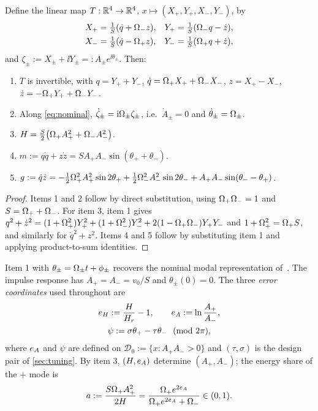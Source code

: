 \begin{lemma}\label{lem:modal}
Define the linear map $T:\mathbb{R}^4\to\mathbb{R}^4$, $x\mapsto(X_+,Y_+,X_-,Y_-)$, by
\begin{equation}\label{eq:T}
\begin{aligned}
  X_+&=\tfrac{1}{S}(\dot q+\Omega_- z), & Y_+&=\tfrac{1}{S}(\Omega_- q-\dot z),\\
  X_-&=\tfrac{1}{S}(\dot q-\Omega_+ z), & Y_-&=\tfrac{1}{S}(\Omega_+ q+\dot z),
\end{aligned}
\end{equation}
and $\zeta_\pm:=X_\pm+\ii Y_\pm=:A_\pm e^{\ii\theta_\pm}$.
Then:
\begin{enumerate}
\item $T$ is invertible, with $q=Y_++Y_-$, $\dot q=\Omega_+ X_++\Omega_- X_-$,
  $z=X_+-X_-$, $\dot z=-\Omega_+ Y_++\Omega_- Y_-$.
\item Along \eqref{eq:nominal}, $\dot\zeta_\pm=\mathrm{i}\Omega_\pm\zeta_\pm$, i.e.\
  $\dot A_\pm=0$ and $\dot\theta_\pm=\Omega_\pm$.
\item $H=\tfrac S2\big(\Omega_+ A_+^2+\Omega_- A_-^2\big)$.
\item $m:=q\dot q+z\dot z = S A_+A_-\sin(\theta_++\theta_-)$.
\item $g:=\dot q\dot z=-\tfrac12\Omega_+^2A_+^2\sin2\theta_+
  +\tfrac12\Omega_-^2A_-^2\sin2\theta_- + A_+A_-\sin(\theta_--\theta_+)$.
\end{enumerate}
\end{lemma}
\begin{proof}
Items 1 and 2 follow by direct substitution, using $\Omega_+\Omega_-=1$ and $S=\Omega_++\Omega_-$.
For item 3, item 1 gives $q^2+\dot z^2=(1+\Omega_+^2)Y_+^2+(1+\Omega_-^2)Y_-^2+2(1-\Omega_+\Omega_-)Y_+Y_-$
and $1+\Omega_+^2=\Omega_+ S$, and similarly for $\dot q^2+z^2$.
Items 4 and 5 follow by substituting item 1 and applying product-to-sum
identities.
\end{proof}

Item 1 with $\theta_\pm=\Omega_\pm t+\phi_\pm$ recovers the nominal modal
representation of~\citet{juchem2027restoring}.
The impulse response has $A_+=A_-=v_0/S$ and $\theta_\pm(0)=0$.
The three \emph{error coordinates} used throughout are
\begin{equation}\label{eq:errors}
\begin{gathered}
  e_H:=\frac{H}{H_r}-1,\qquad e_A:=\ln\frac{A_+}{A_-},\\
  \psi:=\sigma\theta_+-\tau\theta_-\ \ (\mathrm{mod}\ 2\pi),
\end{gathered}
\end{equation}
where $e_A$ and $\psi$ are defined on $\mathcal D_0:=\{x:A_+A_->0\}$ and
$(\tau,\sigma)$ is the design pair of \cref{sec:tuning}.
By item 3, $(H,e_A)$ determine $(A_+,A_-)$; the energy share of the $+$ mode is
\begin{equation}\label{eq:share}
  a:=\frac{S\Omega_+ A_+^2}{2H}=\frac{\Omega_+ e^{2e_A}}{\Omega_+ e^{2e_A}+\Omega_-}\in(0,1).
\end{equation}

